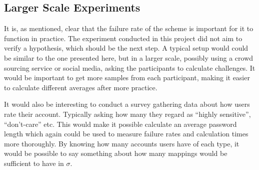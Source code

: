 \subsection{Larger Scale Experiments}
It is, as mentioned, clear that the failure rate of the scheme is important for it to function in practice. The experiment conducted in this project did not aim to verify a hypothesis, which should be the next step. A typical setup would could be similar to the one presented here, but in a larger scale, possibly using a crowd sourcing service or social media, asking the participants to calculate challenges. It would be important to get more samples from each participant, making it easier to calculate different averages after more practice.  
\par It would also be interesting to conduct a survey gathering data about how users rate their account. Typically asking how many they regard as ``highly sensitive'', ``don't-care'' etc. This would make it possible calculate an average password length which again could be used to measure failure rates and calculation times more thoroughly. By knowing how many accounts users have of each type, it would be possible to say something about how many mappings would be sufficient to have in $\sigma$. 
